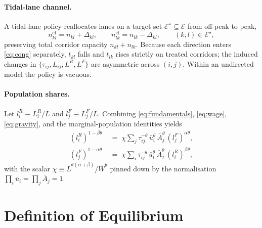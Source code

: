 \documentclass[12pt]{article}
\newcommand{\E}{\mathcal E}
\newcommand{\Lbar}{\bar L}
\newcommand{\Wbar}{\bar W}
\newcommand{\ubar}{\bar u}
\newcommand{\Abar}{\bar A}
\newcommand{\tkl}{t_{kl}}
\newcommand{\tijk}{\tau_{ij}}
\newcommand{\cf}{\mathrm{cf}}
\begin{document}
\paragraph{Tidal-lane channel.}
A tidal-lane policy reallocates lanes on a target set
$\E^{\star}\subseteq\E$ from off-peak to peak,
\begin{equation}
  n_{kl}^{\cf}=n_{kl}+\Delta_{kl},\qquad
  n_{lk}^{\cf}=n_{lk}-\Delta_{kl},\qquad
  (k,l)\in\E^{\star},
\end{equation}
preserving total corridor capacity $n_{kl}+n_{lk}$.  Because each
direction enters \eqref{eq:cong} separately, $\tkl$ falls and
$t_{lk}$ rises strictly on treated corridors; the induced changes in
$\{\tijk,L_{ij},L^R,L^F\}$ are asymmetric across $(i,j)$.  Within an
undirected model the policy is vacuous.

\paragraph{Population shares.}
Let $l_i^R\equiv L_i^R/\Lbar$ and $l_j^F\equiv L_j^F/\Lbar$.
Combining \eqref{eq:fundamentals}, \eqref{eq:wage},
\eqref{eq:gravity}, and the marginal-population identities yields
\begin{align}
  (l_i^R)^{1-\beta\theta}
  &\;=\;\chi\sum_{j}\tijk^{-\theta}\,\ubar_i^{\theta}\,\Abar_j^{\theta}\,
       (l_j^F)^{\alpha\theta},
  \label{eq:eq_R}\\
  (l_j^F)^{1-\alpha\theta}
  &\;=\;\chi\sum_{i}\tijk^{-\theta}\,\ubar_i^{\theta}\,\Abar_j^{\theta}\,
       (l_i^R)^{\beta\theta},
  \label{eq:eq_F}
\end{align}
with the scalar $\chi\equiv\Lbar^{\theta(\alpha+\beta)}/\Wbar^{\theta}$
pinned down by the normalisation
$\prod_i\ubar_i=\prod_j\Abar_j=1$.

\section{Definition of Equilibrium}\label{sec:eq}
\end{document}
